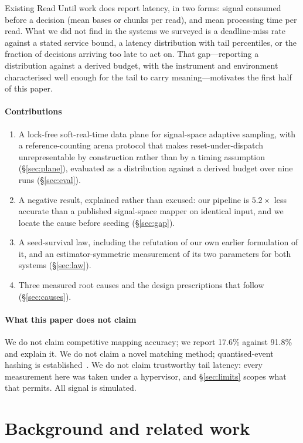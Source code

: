 \documentclass[sigconf,nonacm]{acmart}
\begin{document}
Existing Read Until work does report latency, in two forms: signal consumed before a decision
(mean bases or chunks per read), and mean processing time per read. What we did not find in the
systems we surveyed is a deadline-miss rate against a stated service bound, a latency
distribution with tail percentiles, or the fraction of decisions arriving too late to act on.
That gap---reporting a distribution against a derived budget, with the instrument and
environment characterised well enough for the tail to carry meaning---motivates the first half
of this paper.

\paragraph{Contributions}
\begin{enumerate}
\item A lock-free soft-real-time data plane for signal-space adaptive sampling, with a
reference-counting arena protocol that makes reset-under-dispatch unrepresentable by
construction rather than by a timing assumption (\S\ref{sec:plane}), evaluated as a
distribution against a derived budget over nine runs (\S\ref{sec:eval}).
\item A negative result, explained rather than excused: our pipeline is $5.2\times$ less accurate
than a published signal-space mapper on identical input, and we locate the cause before
seeding (\S\ref{sec:gap}).
\item A seed-survival law, including the refutation of our own earlier formulation of it, and
an estimator-symmetric measurement of its two parameters for both systems
(\S\ref{sec:law}).
\item Three measured root causes and the design prescriptions that follow
(\S\ref{sec:causes}).
\end{enumerate}

\paragraph{What this paper does not claim} We do not claim competitive mapping accuracy; we
report 17.6\% against 91.8\% and explain it. We do not claim a novel matching method;
quantised-event hashing is established~\cite{rawhash,rawhash2}. We do not claim trustworthy
tail latency: every measurement here was taken under a hypervisor, and \S\ref{sec:limits}
scopes what that permits. All signal is simulated.

\section{Background and related work}
\end{document}
